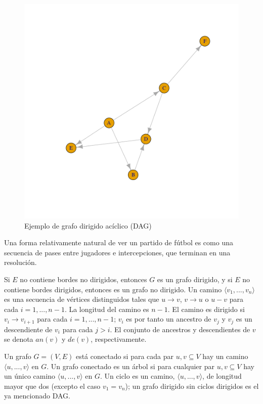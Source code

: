 \begin{figure}[h!]
    \centering
     \includegraphics[width=\textwidth]{./img/dag.png}
     \caption{Ejemplo de grafo dirigido acíclico (DAG)}
     \label{img:dag1}
    \end{figure}

Una forma relativamente natural de ver un partido de fútbol es como una secuencia de 
pases entre jugadores e intercepciones, que terminan en una resolución. 

Si $E$ no contiene bordes no dirigidos, entonces $G$ es un grafo dirigido, y si $E$ no 
contiene bordes dirigidos, entonces es un grafo no dirigido. Un camino $ \langle v_{1},...,v_{n} \rangle $ 
es una secuencia de vértices distinguidos tales que $u \rightarrow v$, $v \rightarrow u$ o $u - v$ para 
cada $i= 1,..., n-1$. 
La longitud del camino es $n-1$. El camino es dirigido si $v_{i} \rightarrow v_{i+1}$ para cada $i= 1,..., n-1$; $v_{i}$ es 
por tanto un ancestro de $v_{j}$ y $v_{j}$ es un descendiente de $v_{i}$ para cada $j > i$. El conjunto de ancestros y 
descendientes de $v$ se denota $an(v)$ y $de(v)$, respectivamente.

Un grafo $G= (V, E)$ está conectado si para cada par ${u, v} \subseteq V$ hay un camino $ \langle u,...,v \rangle$ en $G$. Un 
grafo conectado es un árbol si para cualquier par ${u,v} \subseteq V$ hay un único camino $\langle u,...,v \rangle$ en $G$. Un ciclo 
es un camino, $\langle u,...,v \rangle$, de longitud mayor que dos (excepto el caso $v_{1} = v_{n}$); un grafo dirigido sin ciclos dirigidos 
es el ya mencionado DAG. 


